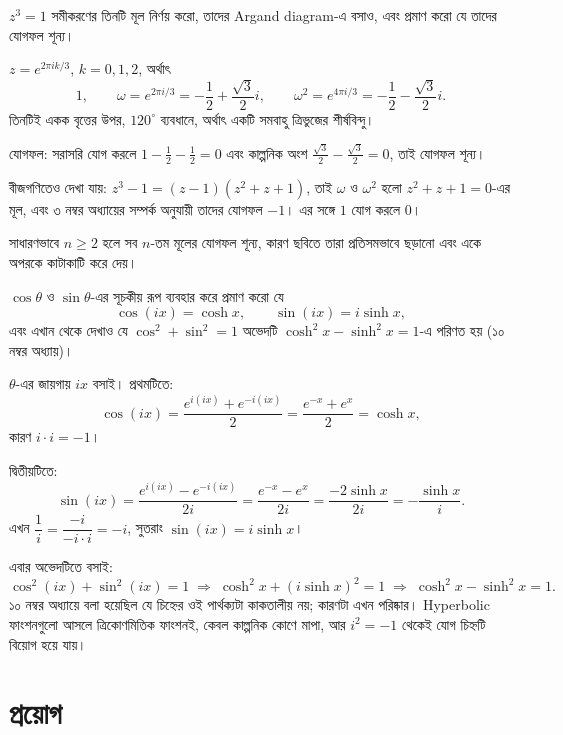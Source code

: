 \documentclass[11pt]{article}
\begin{document}
 $z^{3} = 1$ সমীকরণের তিনটি মূল নির্ণয় করো, তাদের Argand diagram-এ
বসাও, এবং প্রমাণ করো যে তাদের যোগফল শূন্য।

\begin{sol}
$z = e^{2\pi ik/3}$, $k = 0,1,2$, অর্থাৎ
\[
  1, \qquad \omega = e^{2\pi i/3} = -\frac{1}{2} + \frac{\sqrt{3}}{2}i,
  \qquad \omega^{2} = e^{4\pi i/3} = -\frac{1}{2} - \frac{\sqrt{3}}{2}i .
\]
তিনটিই একক বৃত্তের উপর, $120^{\circ}$ ব্যবধানে, অর্থাৎ একটি সমবাহু ত্রিভুজের
শীর্ষবিন্দু।

যোগফল: সরাসরি যোগ করলে
$1 - \tfrac{1}{2} - \tfrac{1}{2} = 0$ এবং কাল্পনিক অংশ
$\tfrac{\sqrt{3}}{2} - \tfrac{\sqrt{3}}{2} = 0$, তাই যোগফল শূন্য।

বীজগণিতেও দেখা যায়: $z^{3}-1 = (z-1)\left( z^{2}+z+1 \right)$, তাই $\omega$
ও $\omega^{2}$ হলো $z^{2}+z+1=0$-এর মূল, এবং ৩ নম্বর অধ্যায়ের সম্পর্ক
অনুযায়ী তাদের যোগফল $-1$। এর সঙ্গে $1$ যোগ করলে $0$।

সাধারণভাবে $n \geq 2$ হলে সব $n$-তম মূলের যোগফল শূন্য, কারণ ছবিতে তারা
প্রতিসমভাবে ছড়ানো এবং একে অপরকে কাটাকাটি করে দেয়।
\end{sol}

 $\cos\theta$ ও $\sin\theta$-এর সূচকীয় রূপ ব্যবহার করে প্রমাণ করো যে
\[
  \cos(ix) = \cosh x, \qquad \sin(ix) = i\sinh x ,
\]
এবং এখান থেকে দেখাও যে $\cos^{2}+\sin^{2}=1$ অভেদটি $\cosh^{2}x -
\sinh^{2}x = 1$-এ পরিণত হয় (১০ নম্বর অধ্যায়)।

\begin{sol}
$\theta$-এর জায়গায় $ix$ বসাই। প্রথমটিতে:
\[
  \cos(ix) = \frac{e^{i(ix)} + e^{-i(ix)}}{2}
           = \frac{e^{-x} + e^{x}}{2} = \cosh x ,
\]
কারণ $i \cdot i = -1$।

দ্বিতীয়টিতে:
\[
  \sin(ix) = \frac{e^{i(ix)} - e^{-i(ix)}}{2i}
           = \frac{e^{-x} - e^{x}}{2i}
           = \frac{-2\sinh x}{2i} = -\frac{\sinh x}{i} .
\]
এখন $\dfrac{1}{i} = \dfrac{-i}{-i \cdot i} = -i$, সুতরাং
$\sin(ix) = i\sinh x$।

এবার অভেদটিতে বসাই:
\[
  \cos^{2}(ix) + \sin^{2}(ix) = 1
  \;\Longrightarrow\;
  \cosh^{2}x + \left( i\sinh x \right)^{2} = 1
  \;\Longrightarrow\;
  \cosh^{2}x - \sinh^{2}x = 1 .
\]
১০ নম্বর অধ্যায়ে বলা হয়েছিল যে চিহ্নের ওই পার্থক্যটা কাকতালীয় নয়; কারণটা
এখন পরিষ্কার। Hyperbolic ফাংশনগুলো আসলে ত্রিকোণমিতিক ফাংশনই, কেবল কাল্পনিক
কোণে মাপা, আর $i^{2} = -1$ থেকেই যোগ চিহ্নটি বিয়োগ হয়ে যায়।
\end{sol}

\section{প্রয়োগ}
\end{document}
